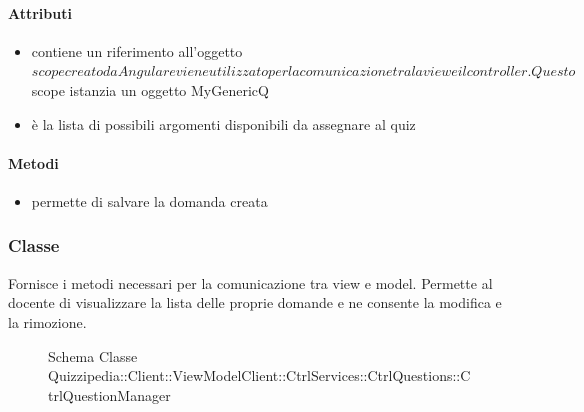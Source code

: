 \paragraph{Attributi}
\begin{itemize}
\item {}
\newline
contiene un riferimento all'oggetto $scope creato da Angular e viene utilizzato per la comunicazione tra la view e il controller. Questo $scope istanzia un oggetto MyGenericQ
\item {}
\newline
è la lista di possibili argomenti disponibili da assegnare al quiz
\end{itemize}
\paragraph{Metodi}
\begin{itemize}
\item {}
\newline
permette di salvare la domanda creata
\newline
\end{itemize}
\subsubsection{Classe }
Fornisce i metodi necessari per la comunicazione tra view e model. Permette al docente di visualizzare la lista delle proprie domande e ne consente la modifica e la rimozione.
\begin{figure}[H]
\centering
\noindent{}
\caption[Schema Classe CtrlQuestionManager]{Schema Classe Quizzipedia::Client::ViewModelClient::CtrlServices::CtrlQuestions::CtrlQuestionManager}
\end{figure}
